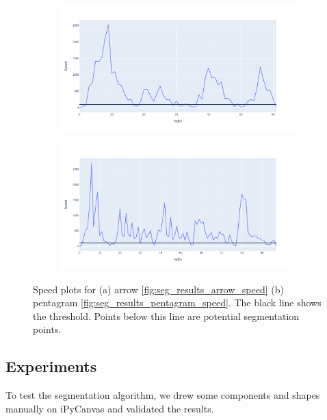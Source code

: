 \begin{figure}
	\begin{subfigure}{0.45\textwidth}
		\centering
		\includegraphics[scale=0.25]{./img/seg_speed_arrow}
		\caption{}
	\end{subfigure}
	\hfill
	\begin{subfigure}{0.45\textwidth}
		\centering
		\includegraphics[scale=0.25]{./img/seg_speed_pentagram}
		\caption{}
	\end{subfigure}
	\caption{Speed plots for (a) arrow \ref{fig:seg_results_arrow_speed} (b) pentagram \ref{fig:seg_results_pentagram_speed}. The black line shows the threshold. Points below this line are potential segmentation points.}
	\label{fig:seg_speed_plots}
\end{figure}

\subsection{Experiments}
\label{sec:seg_experiments}
To test the segmentation algorithm, we drew some components and shapes manually on iPyCanvas and validated the results.\\

